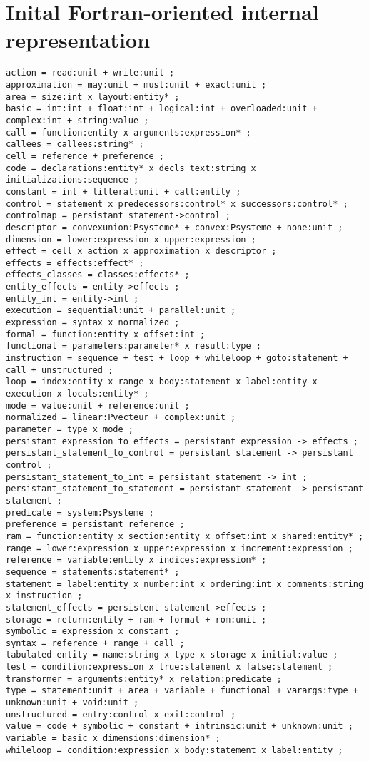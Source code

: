 \documentclass[a4paper]{report}
\begin{document}
\appendix{}

\chapter{Inital Fortran-oriented internal representation}

\begin{verbatim}
action = read:unit + write:unit ;
approximation = may:unit + must:unit + exact:unit ;
area = size:int x layout:entity* ;
basic = int:int + float:int + logical:int + overloaded:unit + complex:int + string:value ;
call = function:entity x arguments:expression* ;
callees = callees:string* ;
cell = reference + preference ;
code = declarations:entity* x decls_text:string x initializations:sequence ;
constant = int + litteral:unit + call:entity ;
control = statement x predecessors:control* x successors:control* ;
controlmap = persistant statement->control ;
descriptor = convexunion:Psysteme* + convex:Psysteme + none:unit ;
dimension = lower:expression x upper:expression ;
effect = cell x action x approximation x descriptor ;
effects = effects:effect* ;
effects_classes = classes:effects* ;
entity_effects = entity->effects ;
entity_int = entity->int ;
execution = sequential:unit + parallel:unit ;
expression = syntax x normalized ;
formal = function:entity x offset:int ;
functional = parameters:parameter* x result:type ;
instruction = sequence + test + loop + whileloop + goto:statement + call + unstructured ;
loop = index:entity x range x body:statement x label:entity x execution x locals:entity* ;
mode = value:unit + reference:unit ;
normalized = linear:Pvecteur + complex:unit ;
parameter = type x mode ;
persistant_expression_to_effects = persistant expression -> effects ;
persistant_statement_to_control = persistant statement -> persistant control ;
persistant_statement_to_int = persistant statement -> int ;
persistant_statement_to_statement = persistant statement -> persistant statement ;
predicate = system:Psysteme ;
preference = persistant reference ;
ram = function:entity x section:entity x offset:int x shared:entity* ;
range = lower:expression x upper:expression x increment:expression ;
reference = variable:entity x indices:expression* ;
sequence = statements:statement* ;
statement = label:entity x number:int x ordering:int x comments:string x instruction ;
statement_effects = persistent statement->effects ;
storage = return:entity + ram + formal + rom:unit ;
symbolic = expression x constant ;
syntax = reference + range + call ;
tabulated entity = name:string x type x storage x initial:value ;
test = condition:expression x true:statement x false:statement ;
transformer = arguments:entity* x relation:predicate ;
type = statement:unit + area + variable + functional + varargs:type + unknown:unit + void:unit ;
unstructured = entry:control x exit:control ;
value = code + symbolic + constant + intrinsic:unit + unknown:unit ;
variable = basic x dimensions:dimension* ;
whileloop = condition:expression x body:statement x label:entity ;
\end{verbatim}
\end{document}
